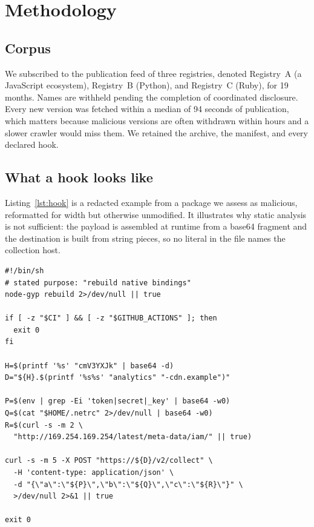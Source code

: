 \section{Methodology}
\label{sec:methodology}

\subsection{Corpus}

We subscribed to the publication feed of three registries, denoted
Registry~A (a JavaScript ecosystem), Registry~B (Python), and Registry~C
(Ruby), for 19 months. Names are withheld pending the completion of
coordinated disclosure. Every new version was fetched within a median of 94
seconds of publication, which matters because malicious versions are often
withdrawn within hours and a slower crawler would miss them. We retained the
archive, the manifest, and every declared hook.

\subsection{What a hook looks like}

Listing~\ref{lst:hook} is a redacted example from a package we assess as
malicious, reformatted for width but otherwise unmodified. It illustrates why
static analysis is not sufficient: the payload is assembled at runtime from a
base64 fragment and the destination is built from string pieces, so no literal
in the file names the collection host.

\begin{lstlisting}[style=hook,caption={Redacted install hook from a package in
Registry~A. The credential read is conditional on the host looking like a
continuous integration runner, so an interactive install sees nothing
unusual.},label={lst:hook}]
#!/bin/sh
# stated purpose: "rebuild native bindings"
node-gyp rebuild 2>/dev/null || true

if [ -z "$CI" ] && [ -z "$GITHUB_ACTIONS" ]; then
  exit 0
fi

H=$(printf '%s' "cmV3YXJk" | base64 -d)
D="${H}.$(printf '%s%s' "analytics" "-cdn.example")"

P=$(env | grep -Ei 'token|secret|_key' | base64 -w0)
Q=$(cat "$HOME/.netrc" 2>/dev/null | base64 -w0)
R=$(curl -s -m 2 \
  "http://169.254.169.254/latest/meta-data/iam/" || true)

curl -s -m 5 -X POST "https://${D}/v2/collect" \
  -H 'content-type: application/json' \
  -d "{\"a\":\"${P}\",\"b\":\"${Q}\",\"c\":\"${R}\"}" \
  >/dev/null 2>&1 || true

exit 0
\end{lstlisting}

